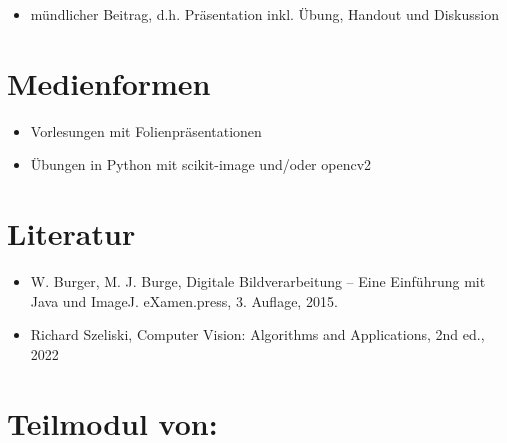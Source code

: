 \begin{itemize}
\tightlist
\item
  mündlicher Beitrag, d.h. Präsentation inkl. Übung, Handout und
  Diskussion
\end{itemize}

\hypertarget{medienformenpathlabelmi-2017modulbeschreibungen-bachelorba_vc-bildverarbeitung-und-computer-vision}{%
\section*{Medienformen\label{/mi-2017/modulbeschreibungen-bachelor/BA_VC-bildverarbeitung-und-computer-vision}}\label{medienformenpathlabelmi-2017modulbeschreibungen-bachelorba_vc-bildverarbeitung-und-computer-vision}}

\begin{itemize}
\tightlist
\item
  Vorlesungen mit Folienpräsentationen
\item
  Übungen in Python mit scikit-image und/oder opencv2
\end{itemize}

\hypertarget{literaturpathlabelmi-2017modulbeschreibungen-bachelorba_vc-bildverarbeitung-und-computer-vision}{%
\section*{Literatur\label{/mi-2017/modulbeschreibungen-bachelor/BA_VC-bildverarbeitung-und-computer-vision}}\label{literaturpathlabelmi-2017modulbeschreibungen-bachelorba_vc-bildverarbeitung-und-computer-vision}}

\begin{itemize}
\tightlist
\item
  W. Burger, M. J. Burge, Digitale Bildverarbeitung -- Eine Einführung
  mit Java und ImageJ. eXamen.press, 3. Auflage, 2015.
\item
  Richard Szeliski, Computer Vision: Algorithms and Applications, 2nd
  ed., 2022
\end{itemize}

\hypertarget{teilmodul-vonpathlabelmi-2017modulbeschreibungen-bachelorba_vc-bildverarbeitung-und-computer-vision}{%
\section*{Teilmodul
von:\label{/mi-2017/modulbeschreibungen-bachelor/BA_VC-bildverarbeitung-und-computer-vision}}\label{teilmodul-vonpathlabelmi-2017modulbeschreibungen-bachelorba_vc-bildverarbeitung-und-computer-vision}}

